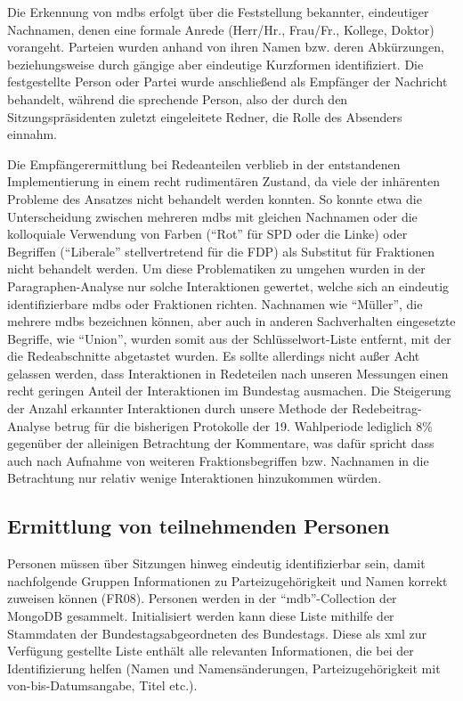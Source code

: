 Die Erkennung von \glspl{mdb} erfolgt über die Feststellung bekannter, eindeutiger
Nachnamen, denen eine formale Anrede (Herr/Hr., Frau/Fr., Kollege, Doktor)
vorangeht. Parteien wurden anhand von ihren Namen bzw. deren Abkürzungen,
beziehungsweise durch gängige aber eindeutige Kurzformen identifiziert. Die
festgestellte Person oder Partei wurde anschließend als Empfänger der Nachricht
behandelt, während die sprechende Person, also der durch den
Sitzungspräsidenten zuletzt eingeleitete Redner, die Rolle des Absenders
einnahm.

Die Empfängerermittlung bei Redeanteilen verblieb in der entstandenen
Implementierung in einem recht rudimentären Zustand, da viele der inhärenten
Probleme des Ansatzes nicht behandelt werden konnten. So konnte etwa die
Unterscheidung zwischen mehreren \glspl{mdb} mit gleichen Nachnamen oder die
kolloquiale Verwendung von Farben (\enquote{Rot} für SPD oder die Linke) oder
Begriffen (\enquote{Liberale} stellvertretend für die FDP) als Substitut für Fraktionen
nicht behandelt werden. Um diese Problematiken zu umgehen wurden in der
Paragraphen-Analyse nur solche Interaktionen gewertet, welche sich an eindeutig
identifizierbare \glspl{mdb} oder Fraktionen richten. Nachnamen wie \enquote{Müller}, die
mehrere \glspl{mdb} bezeichnen können, aber auch in anderen Sachverhalten eingesetzte
Begriffe, wie \enquote{Union}, wurden somit aus der Schlüsselwort-Liste entfernt, mit
der die Redeabschnitte abgetastet wurden. Es sollte allerdings nicht außer Acht gelassen
werden, dass Interaktionen in Redeteilen nach unseren Messungen einen recht geringen Anteil
der Interaktionen im Bundestag ausmachen. Die Steigerung der Anzahl erkannter
Interaktionen durch unsere Methode der Redebeitrag-Analyse betrug für die
bisherigen Protokolle der 19. Wahlperiode lediglich 8\% gegenüber der alleinigen
Betrachtung der Kommentare, was dafür spricht dass auch nach Aufnahme von weiteren
Fraktionsbegriffen bzw. Nachnamen in die Betrachtung nur relativ wenige Interaktionen
hinzukommen würden.

\subsection{Ermittlung von teilnehmenden Personen}
Personen müssen über Sitzungen hinweg eindeutig identifizierbar sein, damit
nachfolgende Gruppen Informationen zu Parteizugehörigkeit und Namen korrekt
zuweisen können (FR08). Personen werden in der \enquote{mdb}-Collection der MongoDB
gesammelt. Initialisiert werden kann diese Liste mithilfe der Stammdaten der
Bundestagsabgeordneten des Bundestags. Diese als \gls{xml} zur Verfügung gestellte
Liste enthält alle relevanten Informationen, die bei der Identifizierung
helfen (Namen und Namensänderungen, Parteizugehörigkeit mit von-bis-Datumsangabe,
Titel etc.).

